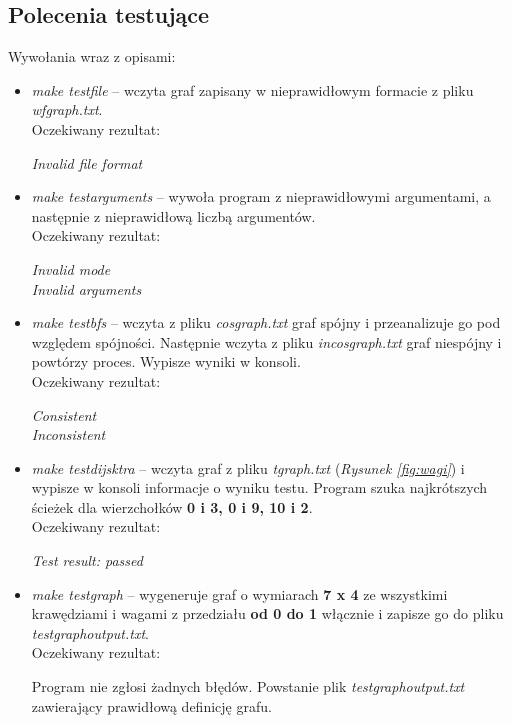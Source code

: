 \documentclass{article}
\begin{document}
\subsection{Polecenia testujące}
\noindent Wywołania wraz z opisami:
\begin{itemize}
    \item \emph{make test\textunderscore file} -- wczyta graf zapisany w nieprawidłowym formacie z pliku \emph{wf\textunderscore graph.txt}.\\
    Oczekiwany rezultat:
    
    \medskip
    
    \emph{Invalid file format}
    \item \emph{make test\textunderscore arguments} -- wywoła program z nieprawidłowymi argumentami, a następnie z nieprawidłową liczbą argumentów.\\ Oczekiwany rezultat:
    
    \medskip
    
    \emph{Invalid mode}\\
    \emph{Invalid arguments}
    
    \item \emph{make test\textunderscore bfs} -- wczyta z pliku \emph{cos\textunderscore graph.txt} graf spójny i przeanalizuje go pod względem spójności. Następnie wczyta z pliku \emph{incos\textunderscore graph.txt} graf niespójny i powtórzy proces. Wypisze wyniki w konsoli.\\
    Oczekiwany rezultat:
    
    \medskip
    
    \emph{Consistent}\\
    \emph{Inconsistent}
    
\newpage
    
    \item \emph{make test\textunderscore dijsktra} -- wczyta graf z pliku \emph{t\textunderscore graph.txt} (\emph{Rysunek \ref{fig:wagi}}) i wypisze w konsoli informacje o wyniku testu. Program szuka najkrótszych ścieżek dla wierzchołków \textbf{0 i 3, 0 i 9, 10 i 2}.\\
    Oczekiwany rezultat:
    
    \medskip
    
    \emph{Test result: passed}
    \item \emph{make test\textunderscore graph} -- wygeneruje graf o wymiarach \textbf{7 x 4} ze wszystkimi krawędziami i wagami z przedziału \textbf{od 0 do 1} włącznie i zapisze go \linebreak do pliku \emph{test\textunderscore graph\textunderscore output.txt}.\\
    Oczekiwany rezultat:
    
    \medskip
    
    Program nie zgłosi żadnych błędów. Powstanie plik \emph{test\textunderscore graph\textunderscore output.txt} zawierający prawidłową definicję grafu.
    
\end{itemize}
\end{document}
